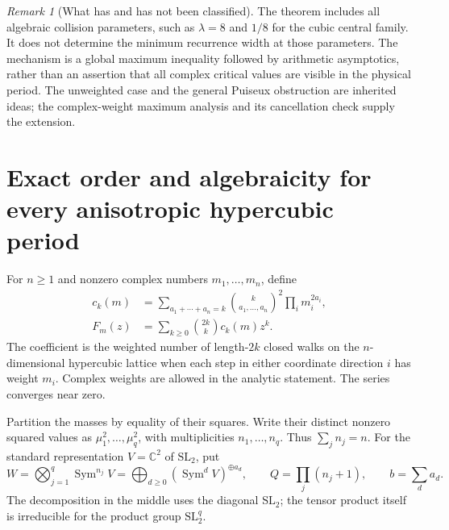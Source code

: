 \documentclass[11pt,a4paper]{article}
\theoremstyle{definition}
\theoremstyle{remark}
\newtheorem{remark}[theorem]{Remark}
\numberwithin{equation}{section}
\begin{document}
\begin{remark}[What has and has not been classified]
The theorem includes all algebraic collision parameters, such as
$\lambda=8$ and $1/8$ for the cubic central family. It does not
determine the minimum recurrence width at those parameters. The
mechanism is a global maximum inequality followed by arithmetic
asymptotics, rather than an assertion that all complex critical values
are visible in the physical period. The unweighted case and the
general Puiseux obstruction are inherited ideas; the complex-weight
maximum analysis and its cancellation check supply the extension.
\end{remark}



\section{Exact order and algebraicity for every anisotropic hypercubic period}
\label{p5:bg:sec}

For $n\ge1$ and nonzero complex numbers $m_1,\ldots,m_n$, define
\begin{align}
 c_k(m)&=\sum_{a_1+\cdots+a_n=k}
       \binom{k}{a_1,\ldots,a_n}^{\!2}\prod_i m_i^{2a_i},\\
 F_m(z)&=\sum_{k\ge0}\binom{2k}{k}c_k(m)z^k.
 \label{p5:bg:F}
\end{align}
The coefficient is the weighted number of length-$2k$ closed walks
on the $n$-dimensional hypercubic lattice when each step in either
coordinate direction $i$ has weight $m_i$.  Complex weights are
allowed in the analytic statement.  The series converges near zero.

Partition the masses by equality of their squares.  Write their
distinct nonzero squared values as $\mu_1^2,\ldots,\mu_q^2$, with
multiplicities $n_1,\ldots,n_q$.  Thus $\sum_jn_j=n$.  For the
standard representation $V=\mathbb C^2$ of $\mathrm{SL}_2$, put
\begin{equation}\label{p5:bg:W}
 W=\bigotimes_{j=1}^q\operatorname{Sym}^{n_j}V
     =\bigoplus_{d\ge0}(\operatorname{Sym}^dV)^{\oplus a_d},
 \qquad Q=\prod_j(n_j+1),\qquad b=\sum_da_d.
\end{equation}
The decomposition in the middle uses the diagonal $\mathrm{SL}_2$;
the tensor product itself is irreducible for the product group
$\mathrm{SL}_2^q$.
\end{document}
